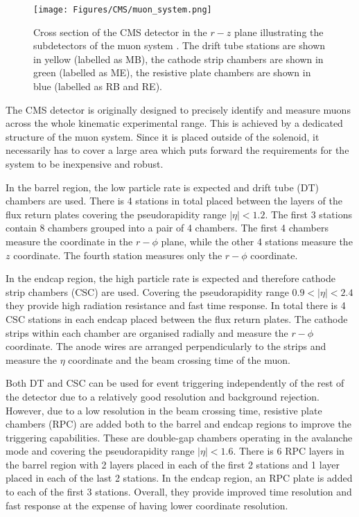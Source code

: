 \begin{figure}[h!]
    \centering
    \texttt{[image: Figures/CMS/muon\_system.png]}
    \caption{Cross section of the CMS detector in the $r-z$ plane illustrating the subdetectors of the muon system \cite{CMS:2018rym}. The drift tube stations are shown in yellow (labelled as MB), the cathode strip chambers are shown in green (labelled as ME), the resistive plate chambers are shown in blue (labelled as RB and RE).}
    \label{fig:muon-system}
\end{figure}

The CMS detector is originally designed to precisely identify and measure muons across the whole kinematic experimental range. This is achieved by a dedicated structure of the muon system. Since it is placed outside of the solenoid, it necessarily has to cover a large area which puts forward the requirements for the system to be inexpensive and robust.

In the barrel region, the low particle rate is expected and drift tube (DT) chambers are used. There is 4 stations in total placed between the layers of the flux return plates covering the pseudorapidity range $|\eta| < 1.2$. The first 3 stations contain 8 chambers grouped into a pair of 4 chambers. The first 4 chambers measure the coordinate in the $r-\phi$ plane, while the other 4 stations measure the $z$ coordinate. The fourth station measures only the $r-\phi$ coordinate.

In the endcap region, the high particle rate is expected and therefore cathode strip chambers (CSC) are used. Covering the pseudorapidity range $0.9 < |\eta| < 2.4$ they provide high radiation resistance and fast time response. In total there is 4 CSC stations in each endcap placed between the flux return plates. The cathode strips within each chamber are organised radially and measure the $r-\phi$ coordinate. The anode wires are arranged perpendicularly to the strips and measure the $\eta$ coordinate and the beam crossing time of the muon.

Both DT and CSC can be used for event triggering independently of the rest of the detector due to a relatively good \pt resolution and background rejection. However, due to a low resolution in the beam crossing time, resistive plate chambers (RPC) are added both to the barrel and endcap regions to improve the triggering capabilities. These are double-gap chambers operating in the avalanche mode and covering the pseudorapidity range $|\eta| < 1.6$. There is 6 RPC layers in the barrel region with 2 layers placed in each of the first 2 stations and 1 layer placed in each of the last 2 stations. In the endcap region, an RPC plate is added to each of the first 3 stations. Overall, they provide improved time resolution and fast response at the expense of having lower coordinate resolution.

